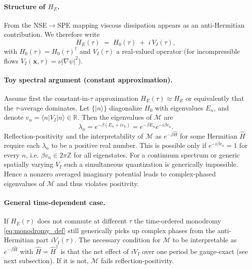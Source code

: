 \documentclass[11pt]{article}
\begin{document}
\paragraph{Structure of \(H_E\).}
From the NSE\(\to\)SPE mapping viscous dissipation appears as an anti-Hermitian contribution.
We therefore write
\begin{equation}\label{eq:HE_decomp}
    H_E(\tau) \;=\; H_0(\tau) \;+\; i\,V_I(\tau),
\end{equation}
with \(H_0(\tau)=H_0(\tau)^\dagger\) and \(V_I(\tau)\) a real-valued operator (for incompressible flows \(V_I(\mathbf x,\tau)=\nu|\nabla\psi|^2\)).

\paragraph{Toy spectral argument (constant approximation).}
Assume first the constant-in-\(\tau\) approximation \(H_E(\tau)\approx H_E\) or equivalently that the \(\tau\)-average dominates. Let \(\{|n\rangle\}\) diagonalize \(H_0\) with eigenvalues \(E_n\), and denote \(v_n=\langle n|V_I|n\rangle\in\mathbb R\). Then the eigenvalues of \(\mathcal M\) are
\[
\lambda_n = e^{-\beta(E_n + i v_n)} = e^{-\beta E_n} e^{-i\beta v_n}.
\]
Reflection-positivity and the interpretability of \(\mathcal M\) as \(e^{-\beta\widehat H}\) for some Hermitian \(\widehat H\) require each \(\lambda_n\) to be a positive real number. This is possible only if \(e^{-i\beta v_n}=1\) for every \(n\), i.e. \(\beta v_n\in 2\pi\mathbb Z\) for all eigenstates. For a continuum spectrum or generic spatially varying \(V_I\) such a simultaneous quantization is generically impossible. Hence a nonzero averaged imaginary potential leads to complex-phased eigenvalues of \(\mathcal M\) and thus violates positivity.

\paragraph{General time-dependent case.}
If \(H_E(\tau)\) does not commute at different \(\tau\) the time-ordered monodromy \eqref{eq:monodromy_def} still generically picks up complex phases from the anti-Hermitian part \(iV_I(\tau)\). The necessary condition for \(\mathcal M\) to be interpretable as \(e^{-\beta\widehat H}\) with \(\widehat H=\widehat H^\dagger\) is that the net effect of \(iV_I\) over one period be gauge-exact (see next subsection). If it is not, \(\mathcal M\) fails reflection-positivity.
\end{document}
